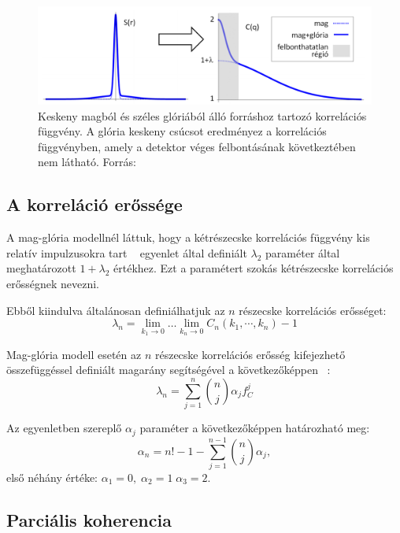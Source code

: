 \documentclass[11pt,a4paper]{article}
\numberwithin{equation}{subsection}
\numberwithin{figure}{section}
\begin{document}
\begin{figure}[H]
\centering
\includegraphics[scale=0.4]{pic/BEintro/CH2}
\caption{Keskeny magból és széles glóriából álló forráshoz tartozó korrelációs függvény. A glória keskeny csúcsot eredményez a korrelációs függvényben, amely a detektor véges felbontásának következtében nem látható. Forrás: ~\cite{CsanadHabil}}
\label{fig:ch2}
\end{figure}


\subsection{A korreláció erőssége}
A mag-glória modellnél láttuk, hogy a kétrészecske korrelációs függvény kis relatív impulzusokra tart ~ egyenlet által definiált $\lambda_2$ paraméter által meghatározott $1+\lambda_2$ értékhez. Ezt a paramétert szokás kétrészecske korrelációs erősségnek nevezni.

Ebből kiindulva általánosan definiálhatjuk az $n$ részecske korrelációs erősséget:
\begin{equation}
\lambda_n = \lim_{k_1\rightarrow 0}\dots\lim_{k_n\rightarrow 0}C_n(k_1,\cdots,k_n)-1
\label{eq:lambdan}
\end{equation}

Mag-glória modell esetén az $n$ részecske korrelációs erősség kifejezhető ~ összefüggéssel definiált magarány segítségével a következőképpen ~\cite{Csorgo:1997uf}:
\begin{equation}
\lambda_n =\sum_{j=1}^n\binom{n}{j}\alpha_j f_C^j
\label{eq:CHlambdan}
\end{equation}

Az egyenletben szereplő $\alpha_j$ paraméter a következőképpen határozható meg:
\begin{equation}
\alpha_n = n!-1-\sum_{j=1}^{n-1}\binom{n}{j}\alpha_j,
\label{eq:alphan}
\end{equation}
első néhány értéke: $\alpha_1=0,\;\alpha_2=1\;\alpha_3=2$.

\subsection{Parciális koherencia}
\end{document}
